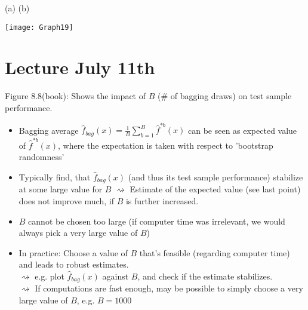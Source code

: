 \documentclass[11pt,a4paper,numbers=endperiod]{scrartcl}
\newcommand{\tit}[1]{\begin{large} \underline{\text{#1}}\end{large}}
\begin{document}
{\tit{Exercise 8.4/4}

(a)  \hspace*{35mm}  (b)\\

\texttt{[image: Graph19]}

\section{Lecture July 11th}

Figure 8.8(book): Shows the impact of $B$ (\# of bagging draws) on test sample performance. \begin{itemize}
	\item Bagging average $\hat{f}_{bag}(x) = \frac{1}{B} \sum\limits_{b = 1}^B \hat{f}^{*b}(x)$ can be seen as expected value of $\hat{f}^{*b}(x)$, where the expectation is taken with respect to 'bootstrap randomness' 
	\item Typically find, that $\hat{f}_{bag}(x)$ (and thus its test sample performance) stabilize at some large value for $B$ $\rightsquigarrow$ Estimate of the expected value (see last point) does not improve much, if $B$ is further increased. 
	\item  $B$ cannot be chosen too large (if computer time was irrelevant, we would always pick a very large value of $B$) 
	\item In practice: Choose a value of $B$ that's feasible (regarding computer time) and leads to robust estimates.\\
	$\rightsquigarrow$ e.g. plot $\hat{f}_{bag}(x)$ against $B$, and check if the estimate stabilizes.\\
	$\rightsquigarrow$ If computations are fast enough, may be possible to simply choose a very large value of $B$, e.g. $B = 1000$ 
\end{itemize}

}
\end{document}
